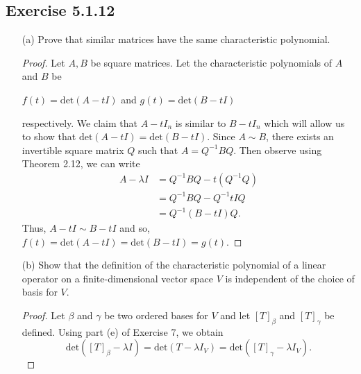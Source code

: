 \subsection*{Exercise 5.1.12} 
\begin{enumerate}
    \item[(a)] Prove that similar matrices have the same characteristic polynomial.
        \begin{proof}
        Let \( A, B  \) be square matrices. Let the characteristic polynomials of \( A  \) and \( B  \) be
        \begin{center}
            \( f(t) = \text{det}(A - t I ) \) and \( g(t) = \text{det}(B - t I) \)
        \end{center}
        respectively.
        We claim that \( A - t {I}_{n} \) is similar to \( B - t {I}_{n} \) which will allow us to show that \( \text{det}(A - t I) = \text{det}(B - t I )  \). Since \( A \sim B  \), there exists an invertible square matrix \( Q  \) such that \( A = Q^{-1} B Q  \). Then observe using Theorem 2.12, we can write 
        \begin{align*}
            A - \lambda I  &= Q^{-1} B Q - t (Q^{-1}Q ) \\
                           &= Q^{-1} B Q - Q^{-1} t  I  Q \\ 
                           &= Q^{-1}(B - t I ) Q.
        \end{align*}
        Thus, \( A - t I \sim B - t I   \) and so, \( f(t) =  \text{det}(A - t I ) = \text{det}(B - t I ) = g(t) \).
        \end{proof}
    \item[(b)] Show that the definition of the characteristic polynomial of a linear operator on a finite-dimensional vector space \( V  \) is independent of the choice of basis for \( V  \). 
        \begin{proof}
        Let \( \beta \) and \( \gamma \) be two ordered bases for \(  V  \) and let \( [T]_{\beta} \) and \( [T]_{\gamma} \) be defined. Using part (e) of Exercise 7, we obtain 
        \[ \text{det}([T]_{\beta} - \lambda I ) =   \text{det}(T - \lambda {I}_{V} ) = \text{det}([T]_{\gamma} - \lambda {I}_{V}). \]
        \end{proof}
\end{enumerate}

